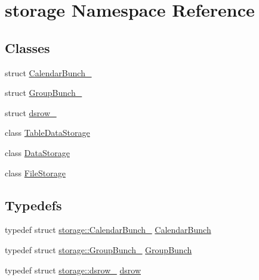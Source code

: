 \hypertarget{namespacestorage}{
\section{storage Namespace Reference}
\label{d0/daa/namespacestorage}
}
\subsection*{Classes}
\begin{DoxyCompactItemize}
\item 
struct \hyperlink{structstorage_1_1CalendarBunch__}{CalendarBunch\_\-}
\item 
struct \hyperlink{structstorage_1_1GroupBunch__}{GroupBunch\_\-}
\item 
struct \hyperlink{structstorage_1_1dsrow__}{dsrow\_\-}
\item 
class \hyperlink{classstorage_1_1TableDataStorage}{TableDataStorage}
\item 
class \hyperlink{classstorage_1_1DataStorage}{DataStorage}
\item 
class \hyperlink{classstorage_1_1FileStorage}{FileStorage}
\end{DoxyCompactItemize}
\subsection*{Typedefs}
\begin{DoxyCompactItemize}
\item 
typedef struct \hyperlink{structstorage_1_1CalendarBunch__}{storage::CalendarBunch\_\-} \hyperlink{namespacestorage_ac4b36de546d492a5eb55d70a72c08f14}{CalendarBunch}
\item 
typedef struct \hyperlink{structstorage_1_1GroupBunch__}{storage::GroupBunch\_\-} \hyperlink{namespacestorage_a60a9af319d8176e62e7c86009c060b5a}{GroupBunch}
\item 
typedef struct \hyperlink{structstorage_1_1dsrow__}{storage::dsrow\_\-} \hyperlink{namespacestorage_a5806ba33485809beb877f39b4b40e6d7}{dsrow}
\end{DoxyCompactItemize}
